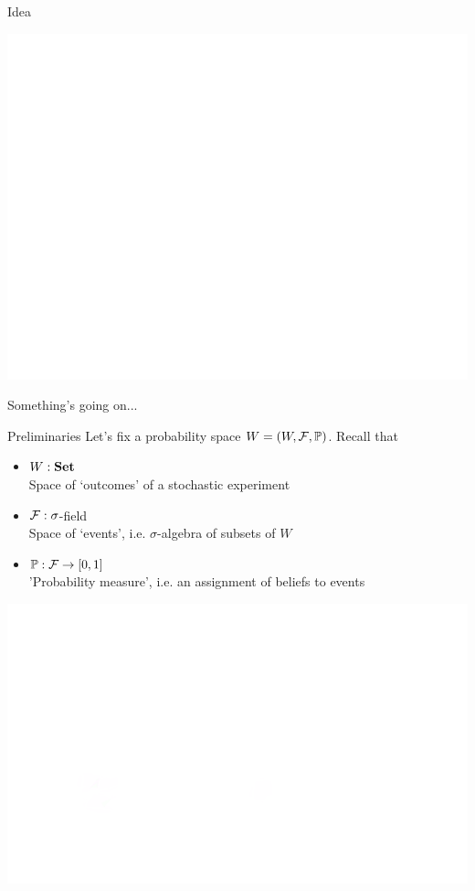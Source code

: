 \begin{frame}{Idea}
	\begin{center}
		\includegraphics[width=\columnwidth]{figures/intro.png}
	\end{center}
	Something's going on...
\end{frame}

\begin{frame}{Preliminaries}
	Let's fix a probability space $W = (W, \mathcal{F}, \mathbb{P})$.
	Recall that
	\begin{itemize}
		\item $W : \mathbf{Set}$\\
		Space of `outcomes' of a stochastic experiment
		\item $\mathcal{F} : \sigma$-field\\
		Space of `events', i.e. $\sigma$-algebra of subsets of $W$
		\item $\mathbb{P} : \mathcal{F} \to [0,1]$\\
		'Probability measure', i.e. an assignment of beliefs to events
	\end{itemize}
	\vfill
	\begin{center}
		\includegraphics[width=.45\columnwidth]{figures/proba-space.png}
	\end{center}
\end{frame}

